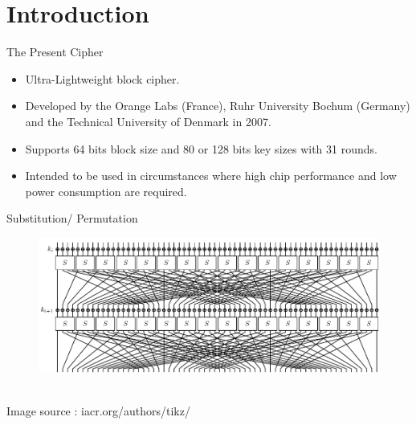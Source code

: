 \section{Introduction}


\begin{frame}{The Present Cipher}
\begin{itemize}
    \item Ultra-Lightweight block cipher.
    \item Developed by the Orange Labs (France), Ruhr University Bochum (Germany) and the Technical University of Denmark in 2007.
    \item Supports 64 bits block size and 80 or 128 bits key sizes with 31 rounds.
    \item Intended to be used in circumstances where high chip performance and low power consumption are required. 
\end{itemize}
\end{frame}

\begin{frame}{Substitution/ Permutation}
\begin{figure}[H]
    \centering
    \includegraphics[width=\linewidth]{PRESENT_diagram.pdf}
\end{figure}
\begin{center}
    \\
    Image source : iacr.org/authors/tikz/
\end{center}
\end{frame}